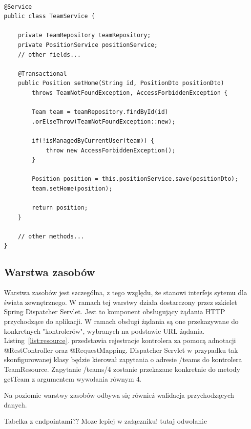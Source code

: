 \begin{minipage}{\linewidth}
\begin{lstlisting}[label=list:service, caption=Fragment przykładowego serwisu, basicstyle=\footnotesize\ttfamily]

@Service
public class TeamService {

    private TeamRepository teamRepository;
    private PositionService positionService;
    // other fields...
    
    @Transactional
    public Position setHome(String id, PositionDto positionDto) 
    	throws TeamNotFoundException, AccessForbiddenException {
    
        Team team = teamRepository.findById(id)
        .orElseThrow(TeamNotFoundException::new);
        
        if(!isManagedByCurrentUser(team)) {
            throw new AccessForbiddenException();
        }

        Position position = this.positionService.save(positionDto);
        team.setHome(position);

        return position;
    }
    
    // other methods...
}
\end{lstlisting}
\end{minipage}


\subsection{Warstwa zasobów}

Warstwa zasobów jest szczególna, z tego względu, że stanowi interfejs sytemu dla świata zewnętrznego. W ramach tej warstwy działa dostarczony przez szkielet Spring Dispatcher Servlet. Jest to komponent obsługujący żądania HTTP przychodzące do aplikacji. W ramach obsługi żądania są one przekazywane do konkretnych "kontrolerów", wybranych na podstawie URL żądania. Listing~\ref{list:resource}. przedstawia rejestracje kontrolera za pomocą adnotacji @RestController oraz @RequestMapping. Dispatcher Servlet w przypadku tak skonfigurowanej klasy będzie kierował zapytania o adresie /teams do kontrolera TeamResource. Zapytanie /teams/4  zostanie przekazane konkretnie do metody getTeam z argumentem wywołania równym 4.

Na poziomie warstwy zasobów odbywa się również walidacja przychodzących danych.

Tabelka z endpointami?? Moze lepiej w załączniku! tutaj odwolanie

